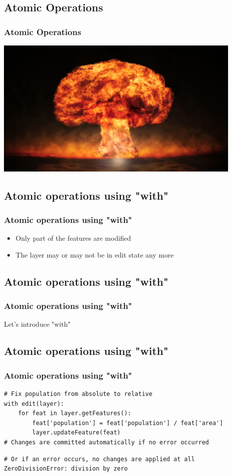 \subsection{Atomic Operations}
\begin{frame}
\frametitle{Atomic Operations}
	\includegraphics[width=0.9\textwidth]{img/atombombe.jpg}
\end{frame}

\subsection{Atomic operations using "with"}
\begin{frame}[fragile]
\frametitle{Atomic operations using "with"}
\begin{itemize}
	\item Only part of the features are modified
	\item The layer may or may not be in edit state any more
\end{itemize}
\end{frame}

\subsection{Atomic operations using "with"}
\begin{frame}[fragile]
\frametitle{Atomic operations using "with"}
Let's introduce "with"
\end{frame}

\subsection{Atomic operations using "with"}
\begin{frame}[fragile]
\frametitle{Atomic operations using "with"}

\begin{lstlisting}[style=pythoncode]
# Fix population from absolute to relative
with edit(layer):
	for feat in layer.getFeatures():
		feat['population'] = feat['population'] / feat['area']
		layer.updateFeature(feat)
# Changes are committed automatically if no error occurred
\end{lstlisting}
\pause
\begin{lstlisting}[style=pythonoutput]
# Or if an error occurs, no changes are applied at all
ZeroDivisionError: division by zero
\end{lstlisting}

\end{frame}

